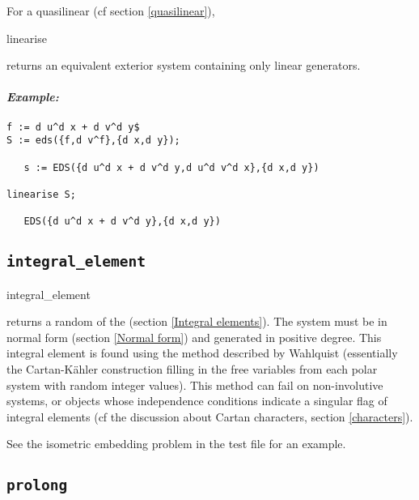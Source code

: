 For a quasilinear  (cf section \ref{quasilinear}),
\begin{syntax}
	linearise 
\end{syntax}
returns an equivalent exterior system containing only linear generators.

\paragraph{\it Example:}
\begin{verbatim}
f := d u^d x + d v^d y$
S := eds({f,d v^f},{d x,d y});

   s := EDS({d u^d x + d v^d y,d u^d v^d x},{d x,d y}) 

linearise S;

   EDS({d u^d x + d v^d y},{d x,d y}) 
\end{verbatim}

\subsection{\tt integral\_element}
\label{integral_element}

\begin{syntax}
	integral\_element 
\end{syntax}
returns a random  of the  (section
\ref{Integral elements}). The system must be in normal form (section
\ref{Normal form}) and generated in positive degree. This integral element
is found using the method described by Wahlquist \cite{Wahlquist}
(essentially the Cartan-K{\"a}hler construction filling in the free variables
from each polar system with random integer values). This method can fail on
non-involutive systems, or  objects whose independence conditions
indicate a singular flag of integral elements (cf the discussion about
Cartan characters, section \ref{characters}).

See the isometric embedding problem in the test file for an example.

\subsection{\tt prolong}
\label{prolong}

